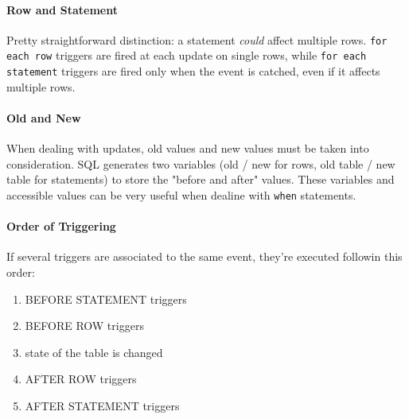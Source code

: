 \documentclass{article}
\begin{document}
		\paragraph{Row and Statement}
			Pretty straightforward distinction: a statement \textit{could} affect multiple rows. \verb|for each row| triggers are fired at each update on single rows, while \verb|for each statement| triggers are fired only when the event is catched, even if it affects multiple rows.

		\paragraph{Old and New}
			When dealing with updates, old values and new values must be taken into consideration. SQL generates two variables (old / new for rows, old table / new table for statements) to store the "before and after" values. These variables and accessible values can be very useful when dealine with \verb|when| statements.

		\paragraph{Order of Triggering}
			If several triggers are associated to the same event, they're executed followin this order:
			\begin{enumerate}
				\item BEFORE STATEMENT triggers
				\item BEFORE ROW triggers
				\item state of the table is changed
				\item AFTER ROW triggers
				\item AFTER STATEMENT triggers
			\end{enumerate}
\end{document}
